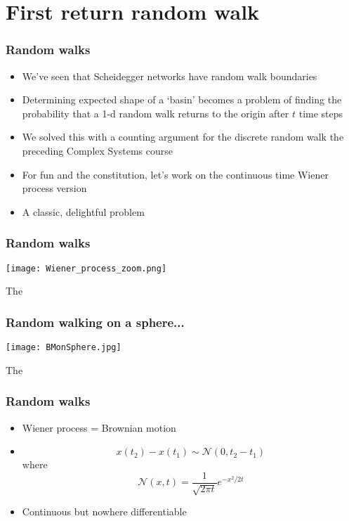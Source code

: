 \section{First return random walk}

\begin{frame}[label=1]
  \frametitle{Random walks}

  \begin{itemize}
  \item<1-> We've seen that Scheidegger networks
    have random walk boundaries\cite{scheidegger1967a,scheidegger1991a} 
  \item<2-> Determining expected shape of a `basin' becomes
    a problem of finding the probability that a 1-d random walk
    returns to the origin after $t$ time steps
  \item<3-> We solved this with a counting argument for
    the discrete random walk the preceding Complex Systems course
  \item<4-> For fun and the constitution, 
    let's work on the continuous time 
    Wiener process version
  \item<5-> A classic, delightful problem
  \end{itemize}

\end{frame}

\begin{frame}[label=]
  \frametitle{Random walks}

  \texttt{[image: Wiener\_process\_zoom.png]}

  The 

\end{frame}

\begin{frame}[label=]
  \frametitle{Random walking on a sphere...}

  \texttt{[image: BMonSphere.jpg]}

  The 

\end{frame}

\begin{frame}[label=]
  \frametitle{Random walks}

  \begin{itemize}
  \item<1-> Wiener process = Brownian motion
  \item<2-> 
    $$
    x(t_2) - x(t_1) \sim \mathcal{N}(0,t_2-t_1)
    $$
    where 
    $$
    \mathcal{N}(x,t) = \frac{1}{\sqrt{2\pi t} } e^{-x^2/2t}
    $$
  \item<3-> Continuous but nowhere differentiable
  \end{itemize}


\end{frame}

